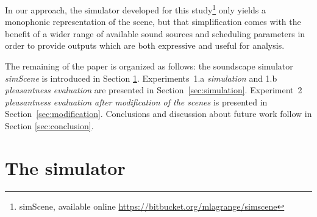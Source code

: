 \documentclass[12pt]{elsarticle}
\newcommand{\cf}{cf.}
\begin{document}
In our approach, the simulator developed for this study\footnote{simScene, available online \url{https://bitbucket.org/mlagrange/simscene}} only yields a monophonic representation of the scene, but that simplification comes with the benefit of a wider range of available sound sources and scheduling parameters in order to provide outputs which are both expressive and useful for analysis.


The remaining of the paper is organized as follows: the soundscape simulator \emph{simScene} is introduced in Section \ref{sec:simulator}. Experiments~1.a \emph{simulation} and  1.b \emph{pleasantness evaluation} are presented in Section~\ref{sec:simulation}. Experiment~2 \emph{pleasantness evaluation after modification of the scenes} is presented in Section~\ref{sec:modification}. Conclusions and discussion about future work follow in Section \ref{sec:conclusion}.






\section{The simulator}
\label{sec:simulator}

\end{document}
